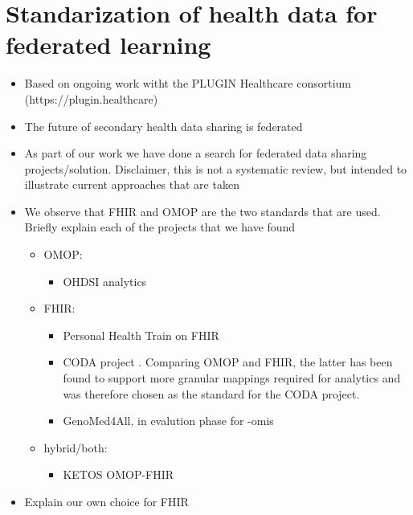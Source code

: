 \documentclass[
  authoryear]{elsarticle}
\providecommand{\tightlist}{%
  \setlength{\itemsep}{0pt}\setlength{\parskip}{0pt}}\usepackage{longtable,booktabs,array}
\begin{document}
\section{Standarization of health data for federated
learning}\label{standarization-of-health-data-for-federated-learning}

\begin{itemize}
\tightlist
\item
  Based on ongoing work witht the PLUGIN Healthcare consortium
  (https://plugin.healthcare)
\item
  The future of secondary health data sharing is federated
  \citep{rieke2020future}
\item
  As part of our work we have done a search for federated data sharing
  projects/solution. Disclaimer, this is not a systematic review, but
  intended to illustrate current approaches that are taken
\item
  We observe that FHIR and OMOP are the two standards that are used.
  Briefly explain each of the projects that we have found

  \begin{itemize}
  \tightlist
  \item
    OMOP:

    \begin{itemize}
    \tightlist
    \item
      OHDSI analytics \citep{khalid2021standardized}
    \end{itemize}
  \item
    FHIR:

    \begin{itemize}
    \tightlist
    \item
      Personal Health Train on FHIR \citep{choudhury2020personal}
    \item
      CODA project \citep{mullie2023coda}. Comparing OMOP and FHIR, the
      latter has been found to support more granular mappings required
      for analytics and was therefore chosen as the standard for the
      CODA project.
    \item
      GenoMed4All, in evalution phase for -omis
      \citep{cremonesi2023need}
    \end{itemize}
  \item
    hybrid/both:

    \begin{itemize}
    \tightlist
    \item
      KETOS OMOP-FHIR \citep{gruendner2019ketos}
    \end{itemize}
  \end{itemize}
\item
  Explain our own choice for FHIR


\end{itemize}
\end{document}

